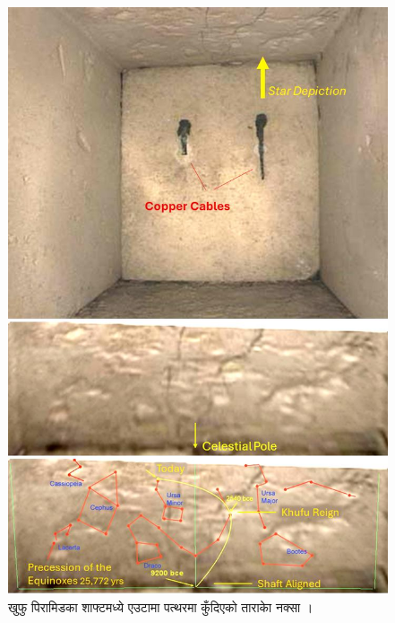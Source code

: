 \documentclass[10pt,twocolumn,letterpaper]{article}
\begin{document}
\begin{figure}[H]
\begin{center}
   \includegraphics[width=1\linewidth]{star-stone.jpg}
\end{center}
   \caption{खुफु पिरामिडका शाफ्टमध्ये एउटामा पत्थरमा कुँदिएको ताराकाे नक्सा \cite{28}।}
\label{fig:20}
\label{fig:onecol}
\end{figure}
\end{document}
